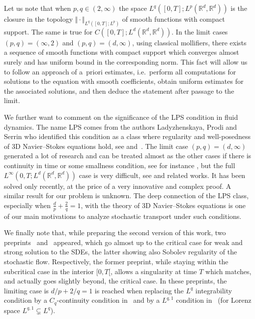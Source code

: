 \documentclass[a4paper,10pt]{article}
\newcommand\1{\mathbbm{1}}
\numberwithin{equation}{section}
\begin{document}
Let us note that when $p,q\in(2,\infty)$ the space $L^{q}([0,T];L^{p}(\mathbb{R}^{d}, \mathbb{R}^{d}))$ is the closure in the topology $\Vert \cdot\Vert_{L^{q}([0,T];L^{p})}$ of smooth functions with compact support. The same is true for $C([ 0,T] ;L^{d}(\mathbb{R}^{d},\mathbb{R}^{d}))$. In the limit cases $(p,q) =(\infty,2)$ and $( p,q)=(d,\infty)$, using classical mollifiers, there exists a sequence of smooth functions with compact support which converges almost surely and has uniform bound in the corresponding norm. This fact will allow us to follow an approach of a~priori estimates, i.e.~perform all computations for solutions to the equation with smooth coefficients, obtain uniform estimates for the associated solutions, and then deduce the statement after passage to the limit.

We further want to comment on the significance of the LPS condition in fluid dynamics. The name LPS comes from the authors Ladyzhenskaya, Prodi and Serrin who identified this condition as a class where regularity and well-posedness of 3D Navier--Stokes equations hold, see \cite{KISLAD57,LIOPRO59,PRODI59,SERRIN62,LADYZ67} and~\cite{Ga}. The limit case $( p,q) =(d,\infty)$ generated a lot of research and can be treated almost as the other cases if there is continuity in time or some smallness condition, see for instance \cite{Be,LIONS96}, but the full $L^{\infty }( 0,T;L^{d}(\mathbb{R}^{d},\mathbb{R}^{d}))$ case is very difficult, see 
\cite{SeSv} and related works. It has been solved only recently, at the price of a very innovative and complex proof. A similar result for our problem is unknown. The deep connection of the LPS class, especially when $\frac{d}{p}+ \frac{2}{q}=1$, with the theory of 3D Navier--Stokes equations is one of our main motivations to analyze stochastic transport under such conditions.

We finally note that, while preparing the second version of this work, two preprints~\cite{WLW} and~\cite{Nam} appeared, which go almost up to the critical case for weak and strong solution to the SDEs, the latter showing also Sobolev regularity of the stochastic flow. Respectively, the former preprint, while staying within the subcritical case in the interior $[0,T[$, allows a singularity at time $T$ which matches, and actually goes slightly beyond, the critical case. In these preprints, the limiting case is $d/p + 2/q =1$ is reached when replacing the $L^q$ integrability condition by a $C_q$-continuity condition in~\cite{WLW} and by a $L^{q,1}$ condition in~\cite{Nam} (for Lorenz space $L^{q,1} \subsetneq L^q$).
\end{document}
